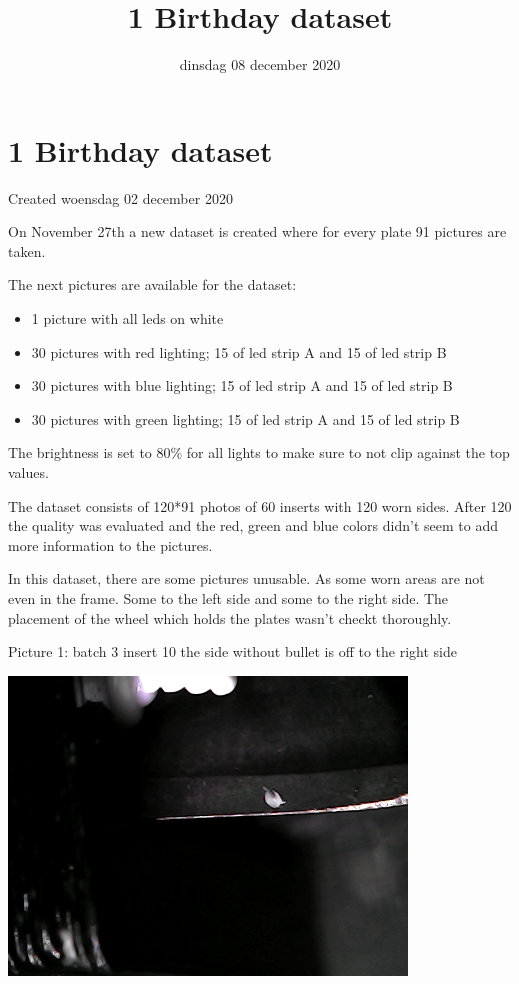 \documentclass{scrartcl}
\title{1 Birthday dataset}
\date{dinsdag 08 december 2020}
\author{}
\begin{document}
\maketitle

		\section{1 Birthday dataset}

Created woensdag 02 december 2020





On November 27th a new dataset is created where for every plate 91 pictures are taken. 



The next pictures are available for the dataset:

\begin{itemize}
\item 1 picture with all leds on white
\item 30 pictures with red lighting; 15 of led strip A and 15 of led strip B
\item 30 pictures with blue lighting; 15 of led strip A and 15 of led strip B
\item 30 pictures with green lighting; 15 of led strip A and 15 of led strip B
\end{itemize}


The brightness is set to 80\% for all lights to make sure to not clip against the top values.



The dataset consists of 120*91 photos of 60 inserts with 120 worn sides. After 120 the quality was evaluated and the red, green and blue colors didn't seem to add more information to the pictures. 



In this dataset, there are some pictures unusable. As some worn areas are not even in the frame. Some to the left side and some to the right side. The placement of the wheel which holds the plates wasn't checkt thoroughly.

Picture 1: batch 3 insert 10 the side without bullet is off to the right side 

\includegraphics[width=4.166667in, keepaspectratio=true]{./1_Birthday_dataset/b_003_p_010_l_000_nb.png}
\end{document}
